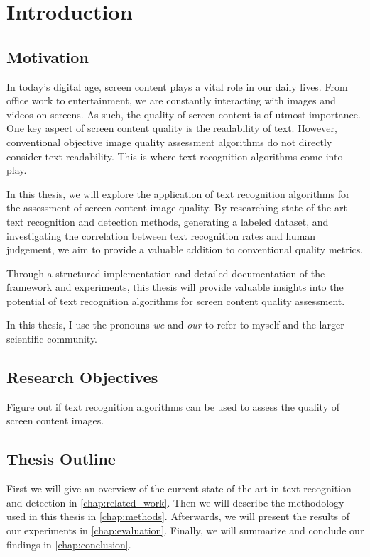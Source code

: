 \chapter{Introduction}
\label{chap:Introduction}

\section{Motivation}

In today’s digital age, screen content plays a vital role in our daily lives.
From office work to entertainment, we are constantly interacting with images and videos on screens.
As such, the quality of screen content is of utmost importance.
One key aspect of screen content quality is the readability of text.
However, conventional objective image quality assessment algorithms do not directly consider text readability.
This is where text recognition algorithms come into play.

In this thesis, we will explore the application of text recognition algorithms for the assessment of screen content image quality.
By researching state-of-the-art text recognition and detection methods, generating a labeled dataset, and investigating the correlation between text recognition rates and human judgement, we aim to provide a valuable addition to conventional quality metrics.

Through a structured implementation and detailed documentation of the framework and experiments, this thesis will provide valuable insights into the potential of text recognition algorithms for screen content quality assessment.

In this thesis, I use the pronouns \textit{we} and \textit{our} to refer to myself and the larger scientific community.

\section{Research Objectives}

Figure out if text recognition algorithms can be used to assess the quality of screen content images.

\section{Thesis Outline}

First we will give an overview of the current state of the art in text recognition and detection in \autoref{chap:related_work}.
Then we will describe the methodology used in this thesis in \autoref{chap:methods}.
Afterwards, we will present the results of our experiments in \autoref{chap:evaluation}.
Finally, we will summarize and conclude our findings in \autoref{chap:conclusion}.
